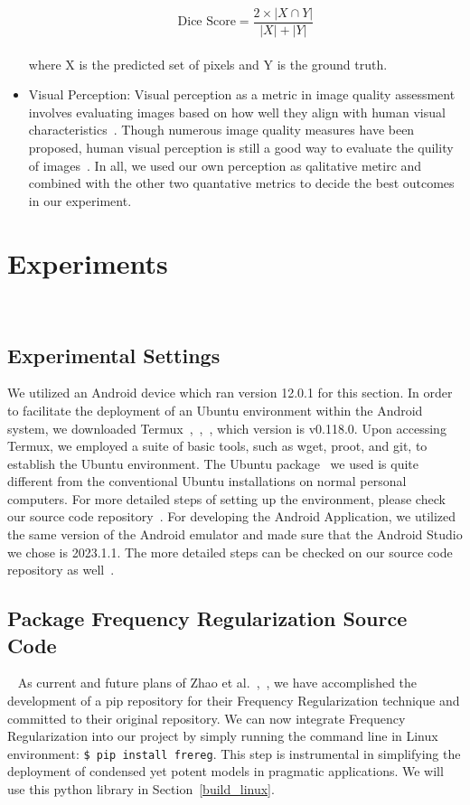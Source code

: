 \documentclass[runningheads]{llncs}
\begin{document}
\begin{itemize}
	\begin{equation}\label{eq:dice}
		\text{Dice Score} = \frac{2 \times |X \cap Y|}{|X| + |Y|}
	\end{equation}
\\where X is the predicted set of pixels and Y is the ground truth.
	\item Visual Perception: Visual perception as a metric in image quality assessment involves evaluating images based on how well they align with human visual characteristics~\cite{fu2016visual}. Though numerous image quality measures have been proposed, human visual perception is still a good way to evaluate the quility of images~\cite{wajid2014visual}. In all, we used our own perception as qalitative metirc and combined with the other two quantative metrics to decide the best outcomes in our experiment. 
\end{itemize}	



\section{Experiments} ~\label{experiments}
\subsection{Experimental Settings}
We utilized an Android device which ran version 12.0.1 for this section. In order to facilitate the deployment of an Ubuntu environment within the Android system, we downloaded Termux~\cite{termux_repo},~\cite{termux_overview},~\cite{termux_wiki}, which version is v0.118.0. Upon accessing Termux, we employed a suite of basic tools, such as wget, proot, and git, to establish the Ubuntu environment. The Ubuntu package~\cite{ubuntu_in_termux_repo} we used is quite different from the conventional Ubuntu installations on normal personal computers. For more detailed steps of setting up the environment, please check our source code repository~\cite{nerual_on_mobile_repo}. For developing the Android Application, we utilized the same version of the Android emulator and made sure that the Android Studio we chose is 2023.1.1. The more detailed steps can be checked on our source code repository as well~\cite{nerual_on_mobile_repo}.


\subsection{Package Frequency Regularization Source Code}~\label{package_fr}
As current and future plans of Zhao et al.~\cite{fr_repo},~\cite{zhao2023fr}, we have accomplished the development of a pip repository for their Frequency Regularization technique and committed to their original repository. We can now integrate Frequency Regularization into our project by simply running the command line in Linux environment: \texttt{\$ pip install frereg}. This step is instrumental in simplifying the deployment of condensed yet potent models in pragmatic applications. We will use this python library in Section~\ref{build_linux}.
\end{document}
